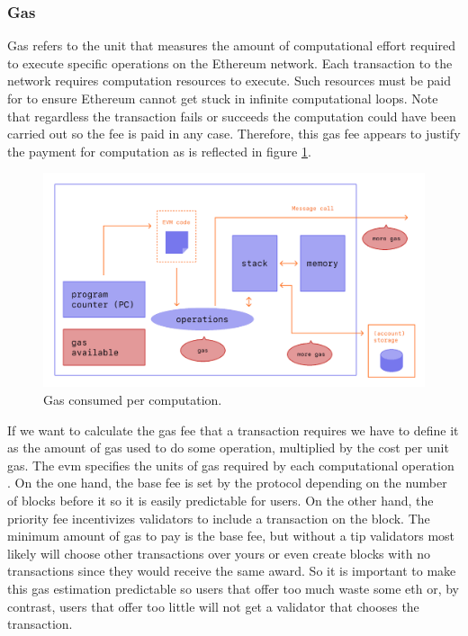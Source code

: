 \subsubsection{Gas}
{Gas refers to the unit that measures the amount of computational effort required to execute specific operations on the Ethereum network. Each transaction to the network requires computation resources to execute. Such resources must be paid for to ensure Ethereum cannot get stuck in infinite computational loops. Note that regardless the transaction fails or succeeds the computation could have been carried out so the fee is paid in any case. Therefore, this gas fee appears to justify the payment for computation as is reflected in figure \ref{fig:gas-per-computation}.

\begin{figure}[H]
\centering
\includegraphics[width=12cm]{img/ethereum/gas.png}
\caption[Gas consumed per computation]{\footnotesize{Gas consumed per computation.}}
\label{fig:gas-per-computation}
\end{figure}

If we want to calculate the gas fee that a transaction requires we have to define it as the amount of gas used to do some operation, multiplied by the cost per unit gas. The \acrshort{evm} specifies the units of gas required by each computational operation \cite{opcodes-evm}. On the one hand, the base fee is set by the protocol depending on the number of blocks before it so it is easily predictable for users. On the other hand, the priority fee incentivizes validators to include a transaction on the block. The minimum amount of gas to pay is the base fee, but without a tip validators most likely will choose other transactions over yours or even create blocks with no transactions since they would receive the same award. So it is important to make this gas estimation predictable so users that offer too much waste some \acrshort{eth} or, by contrast, users that offer too little will not get a validator that chooses the transaction.  

}
